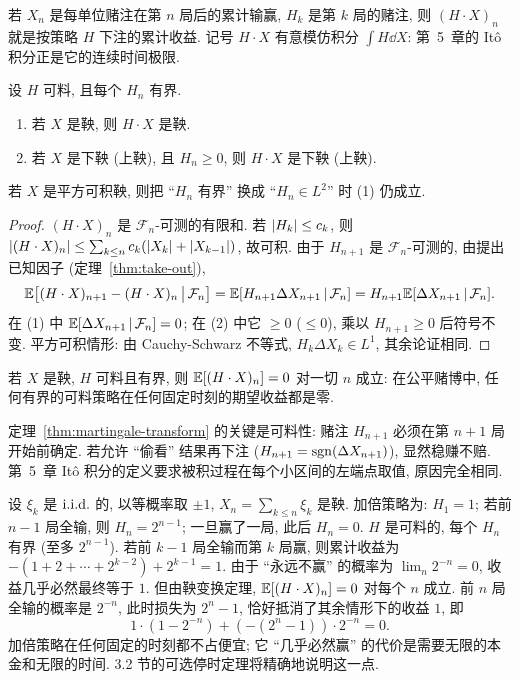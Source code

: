 若 $X_n$ 是每单位赌注在第 $n$ 局后的累计输赢, $H_k$ 是第 $k$ 局的赌注, 则 $(H\cdot X)_n$ 就是按策略 $H$ 下注的累计收益. 记号 $H\cdot X$ 有意模仿积分 $\int H\dd X$: 第~5~章的 Itô 积分正是它的连续时间极限.

\begin{theorem}[鞅变换定理]\label{thm:martingale-transform}
设 $H$ 可料, 且每个 $H_n$ 有界.
\begin{enumerate}
\item 若 $X$ 是鞅, 则 $H\cdot X$ 是鞅.
\item 若 $X$ 是下鞅 (上鞅), 且 $H_n\ge0$, 则 $H\cdot X$ 是下鞅 (上鞅).
\end{enumerate}
若 $X$ 是平方可积鞅, 则把 ``$H_n$ 有界'' 换成 ``$H_n\in L^2$'' 时 (1) 仍成立.
\end{theorem}

\begin{proof}
$(H\cdot X)_n$ 是 $\mathcal{F}_n$-可测的有限和. 若 $\lvert H_k\rvert\le c_k$, 则 $\lvert(H\cdot X)_n\rvert\le\sum_{k\le n}c_k(\lvert X_k\rvert+\lvert X_{k-1}\rvert)$, 故可积. 由于 $H_{n+1}$ 是 $\mathcal{F}_n$-可测的, 由提出已知因子 (定理~\ref{thm:take-out}),
\[
\mathbb{E}\big[(H\cdot X)_{n+1}-(H\cdot X)_n\,\big|\,\mathcal{F}_n\big]=\mathbb{E}[H_{n+1}\Delta X_{n+1}\,|\,\mathcal{F}_n]=H_{n+1}\mathbb{E}[\Delta X_{n+1}\,|\,\mathcal{F}_n].
\]
在 (1) 中 $\mathbb{E}[\Delta X_{n+1}\,|\,\mathcal{F}_n]=0$; 在 (2) 中它 $\ge0$ ($\le0$), 乘以 $H_{n+1}\ge0$ 后符号不变. 平方可积情形: 由 Cauchy-Schwarz 不等式, $H_k\Delta X_k\in L^1$, 其余论证相同.
\end{proof}

\begin{corollary}
若 $X$ 是鞅, $H$ 可料且有界, 则 $\mathbb{E}[(H\cdot X)_n]=0$ 对一切 $n$ 成立: 在公平赌博中, 任何有界的可料策略在任何固定时刻的期望收益都是零.
\end{corollary}

\begin{intuition}
定理~\ref{thm:martingale-transform} 的关键是可料性: 赌注 $H_{n+1}$ 必须在第 $n+1$ 局开始前确定. 若允许 ``偷看'' 结果再下注 ($H_{n+1}=\operatorname{sgn}(\Delta X_{n+1})$), 显然稳赚不赔. 第~5~章 Itô 积分的定义要求被积过程在每个小区间的左端点取值, 原因完全相同.
\end{intuition}

\begin{example}[加倍策略]\label{ex:doubling}
设 $\xi_k$ 是 $\text{i.i.d.}$ 的, 以等概率取 $\pm1$, $X_n=\sum_{k\le n}\xi_k$ 是鞅. 加倍策略为: $H_1=1$; 若前 $n-1$ 局全输, 则 $H_n=2^{n-1}$; 一旦赢了一局, 此后 $H_n=0$. $H$ 是可料的, 每个 $H_n$ 有界 (至多 $2^{n-1}$). 若前 $k-1$ 局全输而第 $k$ 局赢, 则累计收益为 $-(1+2+\cdots+2^{k-2})+2^{k-1}=1$. 由于 ``永远不赢'' 的概率为 $\lim_n2^{-n}=0$, 收益几乎必然最终等于 $1$. 但由鞅变换定理, $\mathbb{E}[(H\cdot X)_n]=0$ 对每个 $n$ 成立. 前 $n$ 局全输的概率是 $2^{-n}$, 此时损失为 $2^n-1$, 恰好抵消了其余情形下的收益 $1$, 即
\[
1\cdot(1-2^{-n})+(-(2^n-1))\cdot2^{-n}=0.
\]
加倍策略在任何固定的时刻都不占便宜; 它 ``几乎必然赢'' 的代价是需要无限的本金和无限的时间. 3.2 节的可选停时定理将精确地说明这一点.
\end{example}

